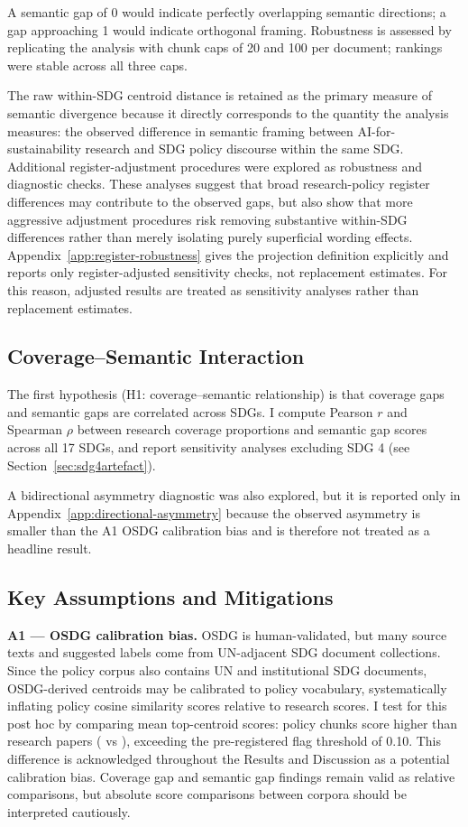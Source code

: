 \documentclass[12pt,a4paper]{article}
\begin{document}
A semantic gap of 0 would indicate perfectly overlapping semantic directions; a gap approaching 1 would indicate orthogonal framing. Robustness is assessed by replicating the analysis with chunk caps of 20 and 100 per document; rankings were stable across all three caps.

The raw within-SDG centroid distance is retained as the primary measure of semantic divergence because it directly corresponds to the quantity the analysis measures: the observed difference in semantic framing between AI-for-sustainability research and SDG policy discourse within the same SDG. Additional register-adjustment procedures were explored as robustness and diagnostic checks. These analyses suggest that broad research-policy register differences may contribute to the observed gaps, but also show that more aggressive adjustment procedures risk removing substantive within-SDG differences rather than merely isolating purely superficial wording effects. Appendix~\ref{app:register-robustness} gives the projection definition explicitly and reports only register-adjusted sensitivity checks, not replacement estimates. For this reason, adjusted results are treated as sensitivity analyses rather than replacement estimates.

\subsection{Coverage--Semantic Interaction}

The first hypothesis (H1: coverage–semantic relationship) is that coverage gaps and semantic gaps are correlated across SDGs. I compute Pearson $r$ and Spearman $\rho$ between research coverage proportions and semantic gap scores across all 17 SDGs, and report sensitivity analyses excluding SDG 4 (see Section~\ref{sec:sdg4artefact}).

A bidirectional asymmetry diagnostic was also explored, but it is reported only in Appendix~\ref{app:directional-asymmetry} because the observed asymmetry is smaller than the A1 OSDG calibration bias and is therefore not treated as a headline result.

\subsection{Key Assumptions and Mitigations}
\label{sec:assumptions}

\textbf{A1 --- OSDG calibration bias.} OSDG is human-validated, but many source texts and suggested labels come from UN-adjacent SDG document collections. Since the policy corpus also contains UN and institutional SDG documents, OSDG-derived centroids may be calibrated to policy vocabulary, systematically inflating policy cosine similarity scores relative to research scores. I test for this post hoc by comparing mean top-centroid scores: policy chunks score \AffFifteenDiff{} higher than research papers (\AffFifteenPolicyScore{} vs \AffFifteenPaperScore), exceeding the pre-registered flag threshold of 0.10. This difference is acknowledged throughout the Results and Discussion as a potential calibration bias. Coverage gap and semantic gap findings remain valid as relative comparisons, but absolute score comparisons between corpora should be interpreted cautiously.
\end{document}
